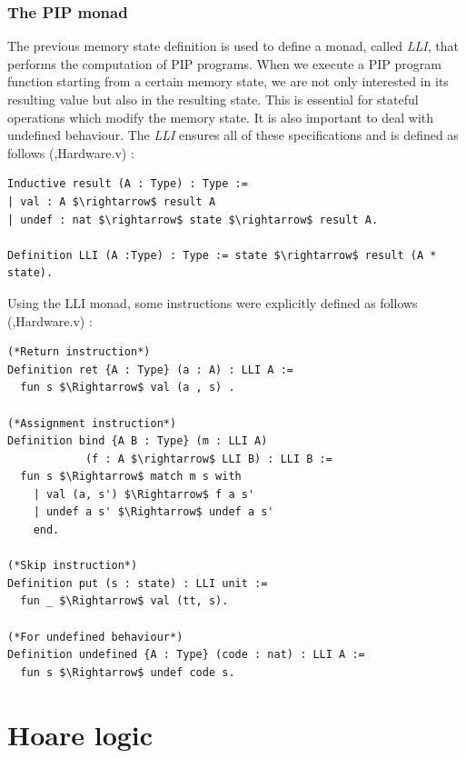\subsubsection{The PIP monad}

The previous memory state definition is used to define a monad, called \textit{LLI}, that performs the computation of PIP programs. When we execute a PIP program function starting from a certain memory state, we are not only interested in its resulting value but also in the resulting state. This is essential for stateful operations which modify the memory state. It is also important to deal with undefined behaviour. The \textit{LLI} ensures all of these specifications and is defined as follows (\cite{PIP},Hardware.v) : 
\begin{lstlisting}[caption = {PIP LLI monad},xleftmargin=-.06\textwidth,xrightmargin=-.06\textwidth,label=monad,mathescape=true]
Inductive result (A : Type) : Type :=
| val : A $\rightarrow$ result A
| undef : nat $\rightarrow$ state $\rightarrow$ result A.

Definition LLI (A :Type) : Type := state $\rightarrow$ result (A * state).
\end{lstlisting}

\noindent Using the LLI monad, some instructions were explicitly defined as follows (\cite{PIP},Hardware.v) : 
\begin{lstlisting}[caption = {Explicitly defined instructions in the shallow embedding},xleftmargin=-.02\textwidth,xrightmargin=-.02\textwidth,label=shallowIns,mathescape=true]
(*Return instruction*)
Definition ret {A : Type} (a : A) : LLI A :=
  fun s $\Rightarrow$ val (a , s) .

(*Assignment instruction*)
Definition bind {A B : Type} (m : LLI A) 
	        (f : A $\rightarrow$ LLI B) : LLI B :=  
  fun s $\Rightarrow$ match m s with
    | val (a, s') $\Rightarrow$ f a s'
    | undef a s' $\Rightarrow$ undef a s'
    end.

(*Skip instruction*)
Definition put (s : state) : LLI unit :=
  fun _ $\Rightarrow$ val (tt, s).

(*For undefined behaviour*)
Definition undefined {A : Type} (code : nat) : LLI A :=
  fun s $\Rightarrow$ undef code s.
\end{lstlisting}
\section{Hoare logic}

